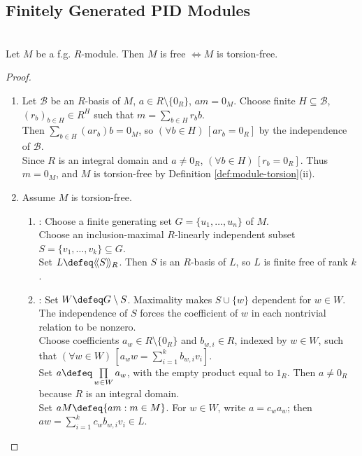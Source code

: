 \subsection{Finitely Generated PID Modules}

\begin{theorem} \label{thm:finitely-generated-torsion-free-pid-free} \\
Let $M$ be a f.g. $R$-module. Then $M$ is free $\iff M$ is torsion-free.
\begin{proof}
\begin{enumerate}[label=\roman*.]
\setlength{\itemsep}{0pt}
\item[$(\Rightarrow)$] Let $\mathcal{B}$ be an $R$-basis of $M$, $a\in R\setminus\{0_R\}$, $am=0_M$. Choose finite $H\subseteq\mathcal{B}$, $(r_b)_{b\in H}\in R^H$ such that $m=\sum\limits_{b\in H}r_bb$.\\
Then $\sum\limits_{b\in H}(ar_b)b=0_M$, so $(\forall b\in H)\,[ar_b=0_R]$ by the independence of $\mathcal{B}$.\\
Since $R$ is an integral domain and $a\neq0_R$, $(\forall b\in H)\,[r_b=0_R]$. Thus $m=0_M$, and $M$ is torsion-free by Definition \ref{def:module-torsion}(ii).
\item[$(\Leftarrow)$] Assume $M$ is torsion-free.
\begin{enumerate}[label=(\alph*)]
\setlength{\itemsep}{0pt}
\item {}: Choose a finite generating set $G=\{u_1,\ldots,u_n\}$ of $M$.\\
Choose an inclusion-maximal $R$-linearly independent subset $S=\{v_1,\ldots,v_k\}\subseteq G$.\\
Set $L\defeq\langle\!\langle S\rangle\!\rangle_R$. Then $S$ is an $R$-basis of $L$, so $L$ is finite free of rank $k$.
\item {}: Set $W\defeq G\setminus S$. Maximality makes $S\cup\{w\}$ dependent for $w\in W$.\\
The independence of $S$ forces the coefficient of $w$ in each nontrivial relation to be nonzero.\\
Choose coefficients $a_w\in R\setminus\{0_R\}$ and $b_{w,i}\in R$, indexed by $w\in W$, such that $(\forall w\in W)\,[a_ww=\sum\limits_{i=1}^k b_{w,i}v_i]$.\\
Set $a\defeq\prod\limits_{w\in W}a_w$, with the empty product equal to $1_R$. Then $a\neq0_R$ because $R$ is an integral domain.\\
Set $aM\defeq\{am:m\in M\}$. For $w\in W$, write $a=c_wa_w$; then $aw=\sum\limits_{i=1}^k c_wb_{w,i}v_i\in L$.\\

\end{enumerate}
\end{enumerate}
\end{proof}
\end{theorem}
